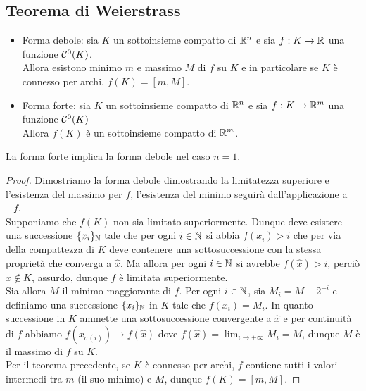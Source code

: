\documentclass{article}
\begin{document}
\subsection{Teorema di Weierstrass}

\begin{theorem}{}{}
    \begin{itemize}
        \item Forma debole: sia $K$ un sottoinsieme compatto di $\mathbb{R}^n$ e sia $f : K \to \mathbb{R}$ una funzione $\mathcal{C}^0(K)$.\\
        Allora esistono minimo $m$ e massimo $M$ di $f$ su $K$ e in particolare se $K$ è connesso per archi, $f(K)=[m,M]$.
        \item Forma forte: sia $K$ un sottoinsieme compatto di $\mathbb{R}^n$ e sia $f:K\to\mathbb{R}^m$ una funzione $\mathcal{C}^0(K)$\\
        Allora $f(K)$ è un sottoinsieme compatto di $\mathbb{R}^m$.
    \end{itemize}
    La forma forte implica la forma debole nel caso $n=1$.
\end{theorem}
\begin{proof}
    Dimostriamo la forma debole dimostrando la limitatezza superiore e l'esistenza del massimo per $f$, l'esistenza del minimo seguirà dall'applicazione a $-f$.\\
    Supponiamo che $f(K)$ non sia limitato superiormente. Dunque deve esistere una successione $\{x_i\}_{\mathbb{N}}$ tale che per ogni $i \in \mathbb{N}$ si abbia $f(x_i)>i$ che per via della compattezza di $K$ deve contenere una sottosuccessione con la stessa proprietà che converga a $\hat{x}$. Ma allora per ogni $i \in \mathbb{N}$ si avrebbe $f(\hat{x})>i$, perciò $\hat{x} \notin K$, assurdo, dunque $f$ è limitata superiormente.\\
    Sia allora $M$ il minimo maggiorante di $f$. Per ogni $i \in \mathbb{N}$, sia $M_i = M - 2^{-i}$ e definiamo una successione $\{x_i\}_{\mathbb{N}}$ in $K$ tale che $f(x_i) = M_i$. In quanto successione in $K$ ammette una sottosuccessione convergente a $\hat{x}$ e per continuità di $f$ abbiamo $f(x_{\sigma(i)})\to f(\hat{x})$ dove $f(\hat{x}) = \lim_{i\to+\infty} M_i = M$, dunque $M$ è il massimo di $f$ su $K$.\\
    Per il teorema precedente, se $K$ è connesso per archi, $f$ contiene tutti i valori intermedi tra $m$ (il suo minimo) e $M$, dunque $f(K) = [m,M]$.
\end{proof}
\end{document}
